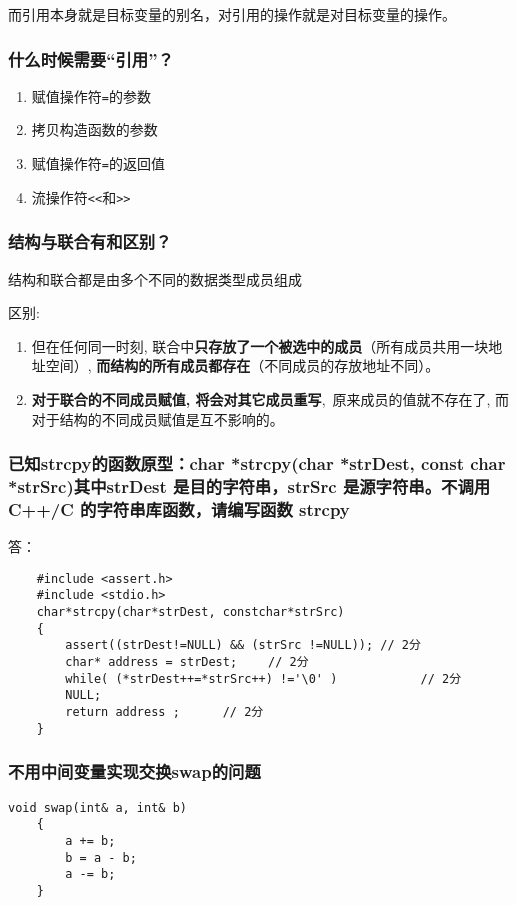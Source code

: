\documentclass[UTF8,a4paper,8pt]{ctexart}
\begin{document}
			而引用本身就是目标变量的别名，对引用的操作就是对目标变量的操作。

		\subsubsection{什么时候需要“引用”？}
			\begin{enumerate}[itemindent = 1em]
				\item 赋值操作符\verb|=|的参数
				\item 拷贝构造函数的参数
				\item 赋值操作符\verb|=|的返回值
				\item 流操作符\verb|<<|和\verb|>>|
			\end{enumerate}
		
		\subsubsection{结构与联合有和区别？}
			结构和联合都是由多个不同的数据类型成员组成
			
			区别:
			\begin{enumerate}[itemindent = 1em]
				\item  但在任何同一时刻, 联合中\textbf{只存放了一个被选中的成员}（所有成员共用一块地址空间）, \textbf{而结构的所有成员都存在}（不同成员的存放地址不同）。
				
				\item  \textbf{对于联合的不同成员赋值, 将会对其它成员重写}, 原来成员的值就不存在了, 而对于结构的不同成员赋值是互不影响的。
			\end{enumerate}
		
		\subsubsection{ 已知strcpy的函数原型：char *strcpy(char *strDest, const char *strSrc)其中strDest 是目的字符串，strSrc 是源字符串。不调用C++/C 的字符串库函数，请编写函数 strcpy}
			答：
			\begin{lstlisting}
	#include <assert.h>
	#include <stdio.h>
	char*strcpy(char*strDest, constchar*strSrc)
	{
		assert((strDest!=NULL) && (strSrc !=NULL)); // 2分
		char* address = strDest; 　　// 2分
		while( (*strDest++=*strSrc++) !='\0' )　　　　　　　// 2分
		NULL; 
		return address ; 　　　// 2分
	}
			\end{lstlisting}
			
		\subsubsection{不用中间变量实现交换swap的问题}
			\begin{lstlisting}[frame=L]
	void swap(int& a, int& b) 
	{  
		a += b;  
		b = a - b;  
		a -= b;  
	}  
			\end{lstlisting}
\end{document}
